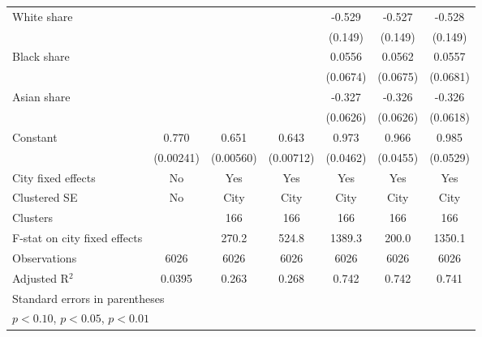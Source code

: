 {\begin{tabular}{l*{6}{c}}
\addlinespace
White share         &                     &                     &                     &      -0.529\sym{***}&      -0.527\sym{***}&      -0.528\sym{***}\\
                    &                     &                     &                     &     (0.149)         &     (0.149)         &     (0.149)         \\
\addlinespace
Black share         &                     &                     &                     &      0.0556         &      0.0562         &      0.0557         \\
                    &                     &                     &                     &    (0.0674)         &    (0.0675)         &    (0.0681)         \\
\addlinespace
Asian share         &                     &                     &                     &      -0.327\sym{***}&      -0.326\sym{***}&      -0.326\sym{***}\\
                    &                     &                     &                     &    (0.0626)         &    (0.0626)         &    (0.0618)         \\
\addlinespace
Constant            &       0.770\sym{***}&       0.651\sym{***}&       0.643\sym{***}&       0.973\sym{***}&       0.966\sym{***}&       0.985\sym{***}\\
                    &   (0.00241)         &   (0.00560)         &   (0.00712)         &    (0.0462)         &    (0.0455)         &    (0.0529)         \\
\midrule
City fixed effects  &          No         &         Yes         &         Yes         &         Yes         &         Yes         &         Yes         \\
Clustered SE        &          No         &        City         &        City         &        City         &        City         &        City         \\
Clusters            &                     &         166         &         166         &         166         &         166         &         166         \\
F-stat on city fixed effects&                     &       270.2         &       524.8         &      1389.3         &       200.0         &      1350.1         \\
Observations        &        6026         &        6026         &        6026         &        6026         &        6026         &        6026         \\
Adjusted R$^2$      &      0.0395         &       0.263         &       0.268         &       0.742         &       0.742         &       0.741         \\
\bottomrule
\multicolumn{7}{l}{\footnotesize Standard errors in parentheses}\\
\multicolumn{7}{l}{\footnotesize \sym{*} \(p<0.10\), \sym{**} \(p<0.05\), \sym{***} \(p<0.01\)}\\
\end{tabular}
}
